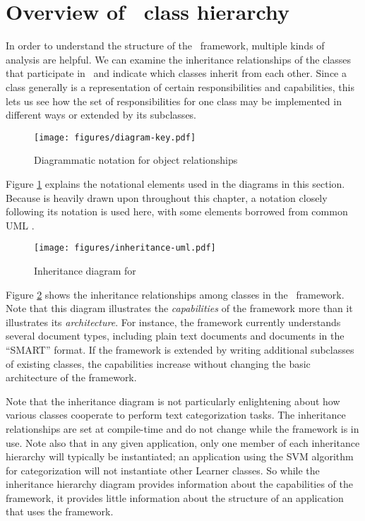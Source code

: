 \section{Overview of \aicat\ class hierarchy}
\label{class-overview}

In order to understand the structure of the \aicat\ framework,
multiple kinds of analysis are helpful.  We can examine the
inheritance relationships of the classes that participate in
\aicat\, and indicate which classes inherit from each other.
Since a class generally is a representation of certain
responsibilities and capabilities, this lets us see how the set of
responsibilities for one class may be implemented in different ways or
extended by its subclasses.

\begin{figure}
\begin{center}
\texttt{[image: figures/diagram-key.pdf]}
\caption{Diagrammatic notation for object relationships}
\label{diagram-key}
\end{center}
\end{figure}

Figure \ref{diagram-key} explains the notational elements used in the
diagrams in this section.  Because \cite{gamma:95} is heavily drawn
upon throughout this chapter, a notation closely following its
notation is used here, with some elements borrowed from common UML
\cite[ch. 4-5]{booch:98}.

\begin{figure}
\texttt{[image: figures/inheritance-uml.pdf]}
\caption{Inheritance diagram for \aicat}
\label{inheritance-uml}
\end{figure}

Figure \ref{inheritance-uml} shows the inheritance relationships among
classes in the \aicat\ framework.  Note that this diagram
illustrates the \emph{capabilities} of the framework more than it
illustrates its \emph{architecture}.  For instance, the framework
currently understands several document types, including plain text
documents and documents in the ``SMART'' format.  If the framework is
extended by writing additional subclasses of existing classes, the
capabilities increase without changing the basic architecture of the
framework.

Note that the inheritance diagram is not particularly enlightening
about how various classes cooperate to perform text categorization
tasks.  The inheritance relationships are set at compile-time and do
not change while the framework is in use.  Note also that in any given
application, only one member of each inheritance hierarchy will
typically be instantiated; an application using the SVM algorithm for
categorization will not instantiate other Learner classes.  So while
the inheritance hierarchy diagram provides information about the
capabilities of the framework, it provides little information about
the structure of an application that uses the framework.

